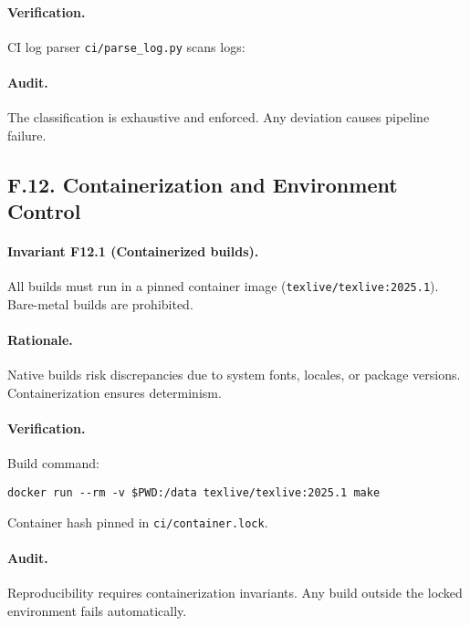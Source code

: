 \paragraph{Verification.}
CI log parser \texttt{ci/parse\_log.py} scans logs:

\paragraph{Audit.}
The classification is exhaustive and enforced. Any deviation causes
pipeline failure.

\subsection*{F.12. Containerization and Environment Control}

\paragraph{Invariant F12.1 (Containerized builds).}
All builds must run in a pinned container image
(\texttt{texlive/texlive:2025.1}). Bare-metal builds are prohibited.

\paragraph{Rationale.}
Native builds risk discrepancies due to system fonts, locales, or
package versions. Containerization ensures determinism.

\paragraph{Verification.}
Build command:
\begin{verbatim}
docker run --rm -v $PWD:/data texlive/texlive:2025.1 make
\end{verbatim}
Container hash pinned in \texttt{ci/container.lock}.

\paragraph{Audit.}
Reproducibility requires containerization invariants. Any build outside
the locked environment fails automatically.

